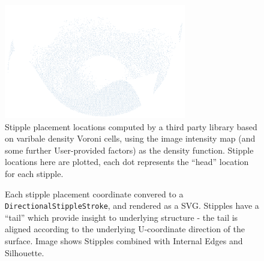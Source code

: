\begin{figure}[h!]
	\centering
	\includegraphics[height=5cm]{images/stipple_placement.png}
	\caption{Stipple placement locations computed by a third party library based on varibale density Voroni cells, using the image intensity map (and some further User-provided factors) as the density function. Stipple locations here are plotted, each dot represents the ``head'' location for each stipple.}\label{stipple_placement}
\end{figure}

\begin{figure}[h!]
	\centering
	
	\caption{Each stipple placement coordinate convered to a \texttt{DirectionalStippleStroke}, and rendered as a SVG. Stipples have a ``tail'' which provide insight to underlying structure - the tail is aligned according to the underlying U-coordinate direction of the surface. Image shows Stipples combined with Internal Edges and Silhouette.}\label{stipple}
\end{figure}